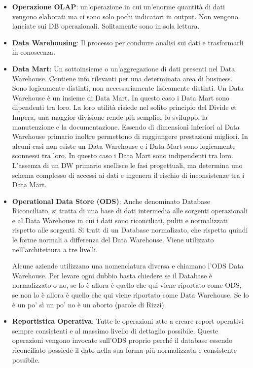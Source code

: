 \begin{itemize}
	\item \textbf{Operazione OLAP}: un'operazione in cui un'enorme quantità di dati vengono elaborati ma ci sono solo pochi indicatori in output. Non vengono lanciate sui DB operazionali. Solitamente sono in sola lettura.
	\item \textbf{Data Warehousing}: Il processo per condurre analisi sui dati e trasformarli in conoscenza.
	\item \textbf{Data Mart}: Un sottoinsieme o un'aggregazione di dati presenti nel Data Warehouse. Contiene info rilevanti per una determinata area di business. Sono logicamente distinti, non necessariamente fisicamente distinti. Un Data Warehouse è un insieme di Data Mart. In questo caso i Data Mart sono dipendenti tra loro. La loro utilità risiede nel solito principio del Divide et Impera, una maggior divisione rende più semplice lo sviluppo, la manutenzione e la documentazione. Essendo di dimensioni inferiori al Data Warehouse primario inoltre permettono di raggiungere prestazioni migliori. In alcuni casi non esiste un Data Warehouse e i Data Mart sono logicamente sconnessi tra loro. In questo caso i Data Mart sono indipendenti tra loro. L’assenza di un DW primario snellisce le fasi progettuali, ma determina uno schema complesso di accessi ai dati e ingenera il rischio di inconsistenze tra i Data Mart.
	\item \textbf{Operational Data Store (ODS)}: Anche denominato Database Riconciliato, si tratta di una base di dati intermedia alle sorgenti operazionali e al Data Warehouse in cui i dati sono riconciliati, puliti e normalizzati rispetto alle sorgenti. Si tratt di un Database normalizato, che rispetta quindi le forme normali a differenza del Data Warehouse. Viene utilizzato nell'architettura a tre livelli.
	\begin{warn}[Nota:]
		Alcune aziende utilizzano una nomenclatura diversa e chiamano l'ODS Data Warehouse. Per levare ogni dubbio basta chiedere se il Database è normalizzato o no, se lo è allora è quello che qui viene riportato come ODS, se non lo è allora è quello che qui viene riportato come Data Warehouse. Se lo è un po' sì un po' no è un aborto (parole di Rizzi).
	\end{warn}
	\item \textbf{Reportistica Operativa}: Tutte le operazioni atte a creare report operativi sempre consistenti e al massimo livello di dettaglio possibile. Queste operazioni vengono invocate sull'ODS proprio perché il database essendo riconciliato possiede il dato nella sua forma più normalizzata e consistente possibile.

\end{itemize}
